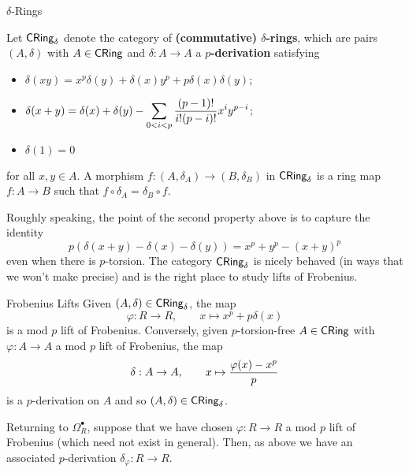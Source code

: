 \documentclass[aspectratio=1610]{beamer}
\renewcommand{\phi}{\varphi}
\begin{document}
\begin{frame}{$\delta$-Rings}
\begin{definition}
Let $\operatorname{\mathsf{CRing}}_{\delta}$ denote the category of \textbf{(commutative) $\delta$-rings}, which are pairs $(A,\delta)$ with $A\in\operatorname{\mathsf{CRing}}$ and $\delta: A\to A$ a \textbf{$p$-derivation} satisfying
\begin{itemize}
\item $\delta(xy)=x^p\delta(y)+\delta(x)y^p+p\delta(x)\delta(y)$;

\item $\delta(x+y)=\delta(x)+\delta(y)-\displaystyle\sum_{0<i<p}\dfrac{(p-1)!}{i!(p-i)!}x^iy^{p-i}$;

\item $\delta(1)=0$
\end{itemize}
for all $x,y\in A$. A morphism $f: (A,\delta_A)\to(B,\delta_B)$ in $\operatorname{\mathsf{CRing}}_{\delta}$ is a ring map $f: A\to B$ such that $f\circ\delta_A=\delta_B\circ f$.
\end{definition}

Roughly speaking, the point of the second property above is to capture the identity 
$$p(\delta(x+y)-\delta(x)-\delta(y))=x^p+y^p-(x+y)^p$$
even when there is $p$-torsion. The category $\operatorname{\mathsf{CRing}}_{\delta}$ is nicely behaved (in ways that we won't make precise) and is the right place to study lifts of Frobenius.
\end{frame}

\begin{frame}{Frobenius Lifts}
Given $(A,\delta)\in\operatorname{\mathsf{CRing}}_{\delta}$, the map
$$\phi: R\to R,\qquad x\mapsto x^p+p\delta(x)$$
is a mod $p$ lift of Frobenius. Conversely, given $p$-torsion-free $A\in\operatorname{\mathsf{CRing}}$ with $\phi: A\to A$ a mod $p$ lift of Frobenius, the map
$$\delta: A\to A,\qquad x\mapsto\df{\phi(x)-x^p}{p}$$
is a $p$-derivation on $A$ and so $(A,\delta)\in\operatorname{\mathsf{CRing}}_{\delta}$.

Returning to $\Omega_R^{\bullet}$, suppose that we have chosen $\phi: R\to R$ a mod $p$ lift of Frobenius (which need not exist in general). Then, as above we have an associated $p$-derivation $\delta_{\phi}: R\to R$. 
\end{frame}
\end{document}
